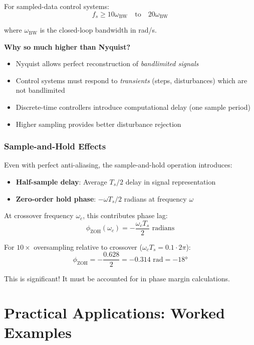 For sampled-data control systems:
\begin{equation}
f_s \geq 10 \omega_{\text{BW}} \quad \text{to} \quad 20 \omega_{\text{BW}}
\label{eq:control_sampling}
\end{equation}

where $\omega_{\text{BW}}$ is the closed-loop bandwidth in rad/s.

\textbf{Why so much higher than Nyquist?}
\begin{itemize}
    \item Nyquist allows perfect reconstruction of \textit{bandlimited signals}
    \item Control systems must respond to \textit{transients} (steps, disturbances) which are not bandlimited
    \item Discrete-time controllers introduce computational delay (one sample period)
    \item Higher sampling provides better disturbance rejection
\end{itemize}

\subsubsection{Sample-and-Hold Effects}

Even with perfect anti-aliasing, the sample-and-hold operation introduces:
\begin{itemize}
    \item \textbf{Half-sample delay}: Average $T_s/2$ delay in signal representation
    \item \textbf{Zero-order hold phase}: $-\omega T_s/2$ radians at frequency $\omega$
\end{itemize}

At crossover frequency $\omega_c$, this contributes phase lag:
\begin{equation}
\phi_{\text{ZOH}}(\omega_c) = -\frac{\omega_c T_s}{2} \text{ radians}
\label{eq:zoh_phase}
\end{equation}

For $10\times$ oversampling relative to crossover ($\omega_c T_s = 0.1 \cdot 2\pi$):
\begin{equation}
\phi_{\text{ZOH}} = -\frac{0.628}{2} = -0.314\text{ rad} = -18°
\end{equation}

This is significant! It must be accounted for in phase margin calculations.

\section{Practical Applications: Worked Examples}
\label{sec:sensor_examples}

